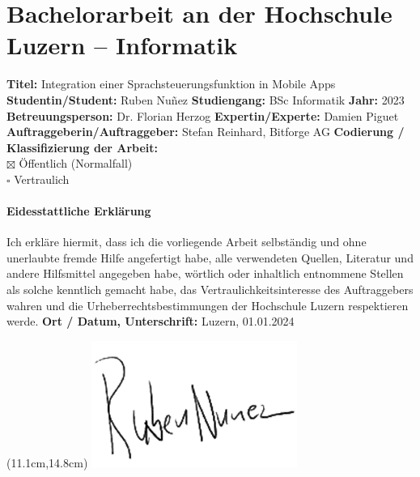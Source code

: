 \documentclass[main.tex]{subfiles} %
\begin{document}
\section*{Bachelorarbeit an der Hochschule Luzern -- Informatik}

\vspace*{0.6cm}

\noindent
\textbf{Titel:} Integration einer Sprachsteuerungsfunktion in Mobile Apps \newline \newline
\textbf{Studentin/Student:} Ruben Nuñez \newline \newline
\textbf{Studiengang:} BSc Informatik \newline \newline
\textbf{Jahr:} 2023 \newline \newline
\textbf{Betreuungsperson:} Dr. Florian Herzog \newline \newline
\textbf{Expertin/Experte:} Damien Piguet \newline \newline
\textbf{Auftraggeberin/Auftraggeber:} Stefan Reinhard, Bitforge AG \newline \newline
\textbf{Codierung / Klassifizierung der Arbeit:} \\
$\boxtimes$ Öffentlich (Normalfall) \\
$\square$ Vertraulich \\




\paragraph{\textbf{Eidesstattliche Erklärung}}
Ich erkläre hiermit, dass ich die vorliegende Arbeit selbständig und ohne unerlaubte fremde
Hilfe angefertigt habe, alle verwendeten Quellen, Literatur und andere Hilfsmittel angegeben
habe, wörtlich oder inhaltlich entnommene Stellen als solche kenntlich gemacht habe, das
Vertraulichkeitsinteresse des Auftraggebers wahren und die Urheberrechtsbestimmungen der
Hochschule Luzern respektieren werde.
\newline
\newline
\newline
\textbf{Ort / Datum, Unterschrift:} Luzern, 01.01.2024
\underline{\hspace*{4cm}}
\begin{textblock*}{12cm}(11.1cm,14.8cm)
\includegraphics[width=0.2\linewidth]{img/Unterschrift.png}
\end{textblock*}
\newline
\newline
\end{document}
